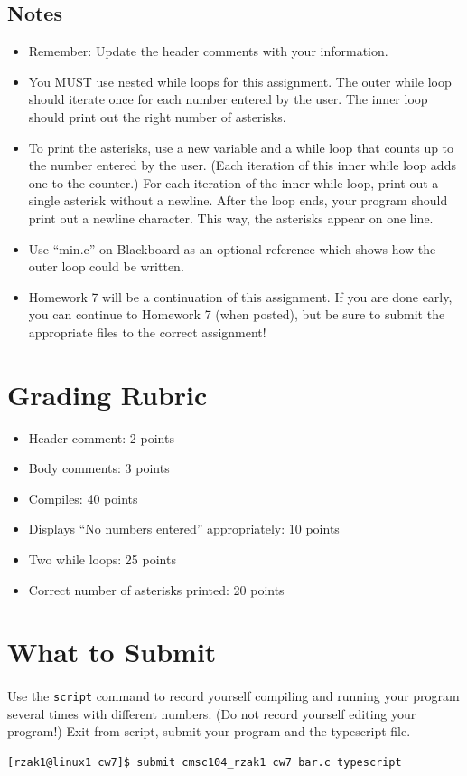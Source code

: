 \documentclass[letter,11pt]{article}
\begin{document}
\subsection*{Notes}
\begin{itemize}
    \item Remember: Update the header comments with your information.
    \item You MUST use nested while loops for this assignment. The outer while loop should iterate once for each number entered by the user. The inner loop should print out the right number of asterisks.
    \item To print the asterisks, use a new variable and a while loop that counts up to the number entered by the user. (Each iteration of this inner while loop adds one to the counter.) For each iteration of the inner while loop, print out a single asterisk without a newline. After the loop ends, your program should print out a newline character. This way, the asterisks appear on one line.
    \item Use ``min.c'' on Blackboard as an optional reference which shows how the outer loop could be written.
    \item Homework 7 will be a continuation of this assignment. If you are done early, you can continue to Homework 7 (when posted), but be sure to submit the appropriate files to the correct assignment!
\end{itemize}

\section*{Grading Rubric}
\begin{itemize}
    \item Header comment: 2 points
    \item Body comments: 3 points
    \item Compiles: 40 points
    \item Displays ``No numbers entered'' appropriately: 10 points
    \item Two while loops: 25 points
    \item Correct number of asterisks printed: 20 points
\end{itemize}

\section*{What to Submit}
\paragraph{}Use the \texttt{script} command to record yourself compiling and running your program several times with different numbers. (Do not record yourself editing your program!) Exit from script, submit your program and the typescript file.
\begin{verbatim}
[rzak1@linux1 cw7]$ submit cmsc104_rzak1 cw7 bar.c typescript
\end{verbatim}
\end{document}
